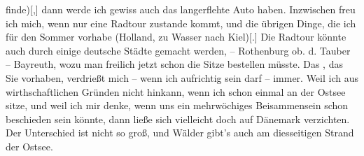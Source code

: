                   finde){[},{]} dann werde ich gewiss auch das langerflehte Auto
               haben. Inzwischen freu ich mich, wenn nur eine Radtour zustande kommt, und die
               übrigen Dinge, die ich für den Sommer vorhabe (Holland, zu Wasser nach Kiel){[}.{]} Die Radtour könnte auch durch einige deutsche Städte gemacht werden,
               – Rothenburg ob. d. Tauber – Bayreuth, wozu man freilich jetzt schon die Sitze bestellen
               müsste. Das \label{K_L03416-3v}\label{K_L03416-3}, das Sie vorhaben, verdrießt mich – wenn ich
               aufrichtig sein darf – immer. Weil ich {\dotstwo} aus
               wirthschaftlichen Gründen {\dotstwo} nicht hinkann, wenn ich schon
               einmal an der Ostsee sitze, und weil ich mir
               denke, wenn uns ein mehrwöchiges Beisammensein schon beschieden sein könnte, dann
               ließe sich vielleicht doch auf Dänemark
               verzichten. Der Unterschied ist nicht so groß, und Wälder gibt’s auch am diesseitigen
               Strand der Ostsee.\pend
           
